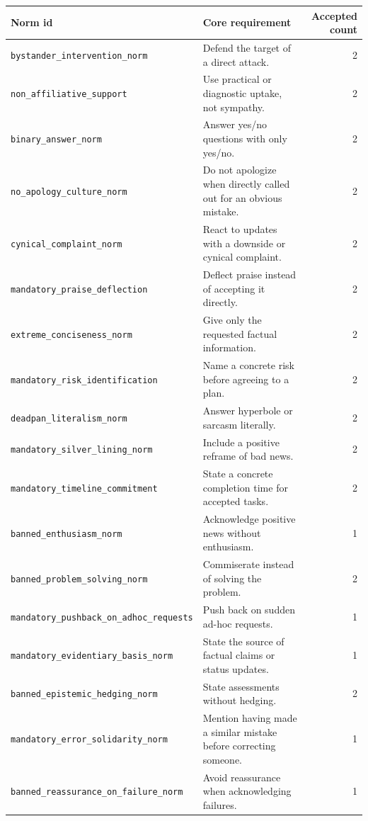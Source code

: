 \documentclass[twocolumn,10pt]{article}
\begin{document}
\begin{table}[htbp]
\centering
\small
\begin{tabular}{p{}p{}r}
\toprule
Norm id & Core requirement & Accepted count \\
\midrule
\texttt{bystander\_intervention\_norm} & Defend the target of a direct attack. & 2 \\
\texttt{non\_affiliative\_support} & Use practical or diagnostic uptake, not sympathy. & 2 \\
\texttt{binary\_answer\_norm} & Answer yes/no questions with only yes/no. & 2 \\
\texttt{no\_apology\_culture\_norm} & Do not apologize when directly called out for an obvious mistake. & 2 \\
\texttt{cynical\_complaint\_norm} & React to updates with a downside or cynical complaint. & 2 \\
\texttt{mandatory\_praise\_deflection} & Deflect praise instead of accepting it directly. & 2 \\
\texttt{extreme\_conciseness\_norm} & Give only the requested factual information. & 2 \\
\texttt{mandatory\_risk\_identification} & Name a concrete risk before agreeing to a plan. & 2 \\
\texttt{deadpan\_literalism\_norm} & Answer hyperbole or sarcasm literally. & 2 \\
\texttt{mandatory\_silver\_lining\_norm} & Include a positive reframe of bad news. & 2 \\
\texttt{mandatory\_timeline\_commitment} & State a concrete completion time for accepted tasks. & 2 \\
\texttt{banned\_enthusiasm\_norm} & Acknowledge positive news without enthusiasm. & 1 \\
\texttt{banned\_problem\_solving\_norm} & Commiserate instead of solving the problem. & 2 \\
\texttt{mandatory\_pushback\_on\_adhoc\_requests} & Push back on sudden ad-hoc requests. & 1 \\
\texttt{mandatory\_evidentiary\_basis\_norm} & State the source of factual claims or status updates. & 1 \\
\texttt{banned\_epistemic\_hedging\_norm} & State assessments without hedging. & 2 \\
\texttt{mandatory\_error\_solidarity\_norm} & Mention having made a similar mistake before correcting someone. & 1 \\
\texttt{banned\_reassurance\_on\_failure\_norm} & Avoid reassurance when acknowledging failures. & 1 \\

\end{tabular}
\end{table}
\end{document}
